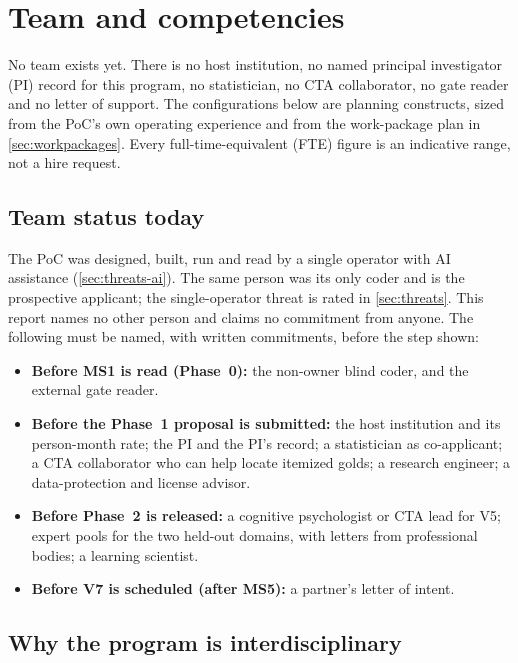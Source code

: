 \section{Team and competencies}
\label{sec:team}

\begin{evfutbox}
  No team exists yet. There is no host institution, no named principal investigator (PI) record
  for this program, no statistician, no CTA collaborator, no gate reader and no letter of support.
  The configurations below are planning constructs, sized from the PoC's own operating experience
  and from the work-package plan in \cref{sec:workpackages}. Every full-time-equivalent (FTE) figure is an indicative
  range, not a hire request.
\end{evfutbox}

\subsection{Team status today}

The PoC was designed, built, run and read by a single operator with AI assistance
(\cref{sec:threats-ai}). The same person was its only coder and is the prospective applicant; the
single-operator threat is rated in \cref{sec:threats}. This report names no other person and
claims no commitment from anyone. The following must be named, with written commitments, before
the step shown:

\begin{itemize}[noitemsep]
  \item \textbf{Before MS1 is read (Phase~0):} the non-owner blind coder, and the external gate
    reader.
  \item \textbf{Before the Phase~1 proposal is submitted:} the host institution and its
    person-month rate; the PI and the PI's record; a statistician as co-applicant; a CTA
    collaborator who can help locate itemized golds; a research engineer; a data-protection and
    license advisor.
  \item \textbf{Before Phase~2 is released:} a cognitive psychologist or CTA lead for V5; expert
    pools for the two held-out domains, with letters from professional bodies; a learning
    scientist.
  \item \textbf{Before V7 is scheduled (after MS5):} a partner's letter of intent.
\end{itemize}

\subsection{Why the program is interdisciplinary}

